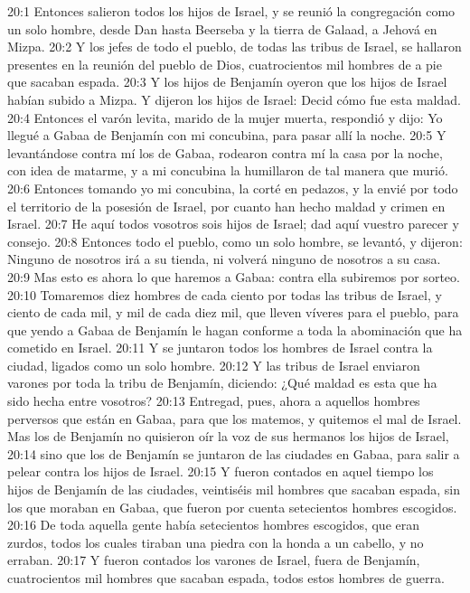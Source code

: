 20:1 Entonces salieron todos los hijos de Israel, y se reunió la congregación como un solo hombre, desde Dan hasta Beerseba y la tierra de Galaad, a Jehová en Mizpa.  
20:2 Y los jefes de todo el pueblo, de todas las tribus de Israel, se hallaron presentes en la reunión del pueblo de Dios, cuatrocientos mil hombres de a pie que sacaban espada.  
20:3 Y los hijos de Benjamín oyeron que los hijos de Israel habían subido a Mizpa. Y dijeron los hijos de Israel: Decid cómo fue esta maldad.  
20:4 Entonces el varón levita, marido de la mujer muerta, respondió y dijo: Yo llegué a Gabaa de Benjamín con mi concubina, para pasar allí la noche.  
20:5 Y levantándose contra mí los de Gabaa, rodearon contra mí la casa por la noche, con idea de matarme, y a mi concubina la humillaron de tal manera que murió.  
20:6 Entonces tomando yo mi concubina, la corté en pedazos, y la envié por todo el territorio de la posesión de Israel, por cuanto han hecho maldad y crimen en Israel.  
20:7 He aquí todos vosotros sois hijos de Israel; dad aquí vuestro parecer y consejo.  
20:8 Entonces todo el pueblo, como un solo hombre, se levantó, y dijeron: Ninguno de nosotros irá a su tienda, ni volverá ninguno de nosotros a su casa.  
20:9 Mas esto es ahora lo que haremos a Gabaa: contra ella subiremos por sorteo.  
20:10 Tomaremos diez hombres de cada ciento por todas las tribus de Israel, y ciento de cada mil, y mil de cada diez mil, que lleven víveres para el pueblo, para que yendo a Gabaa de Benjamín le hagan conforme a toda la abominación que ha cometido en Israel.  
20:11 Y se juntaron todos los hombres de Israel contra la ciudad, ligados como un solo hombre.  
20:12 Y las tribus de Israel enviaron varones por toda la tribu de Benjamín, diciendo: ¿Qué maldad es esta que ha sido hecha entre vosotros?  
20:13 Entregad, pues, ahora a aquellos hombres perversos que están en Gabaa, para que los matemos, y quitemos el mal de Israel. Mas los de Benjamín no quisieron oír la voz de sus hermanos los hijos de Israel,  
20:14 sino que los de Benjamín se juntaron de las ciudades en Gabaa, para salir a pelear contra los hijos de Israel.  
20:15 Y fueron contados en aquel tiempo los hijos de Benjamín de las ciudades, veintiséis mil hombres que sacaban espada, sin los que moraban en Gabaa, que fueron por cuenta setecientos hombres escogidos.  
20:16 De toda aquella gente había setecientos hombres escogidos, que eran zurdos, todos los cuales tiraban una piedra con la honda a un cabello, y no erraban.  
20:17 Y fueron contados los varones de Israel, fuera de Benjamín, cuatrocientos mil hombres que sacaban espada, todos estos hombres de guerra.  
